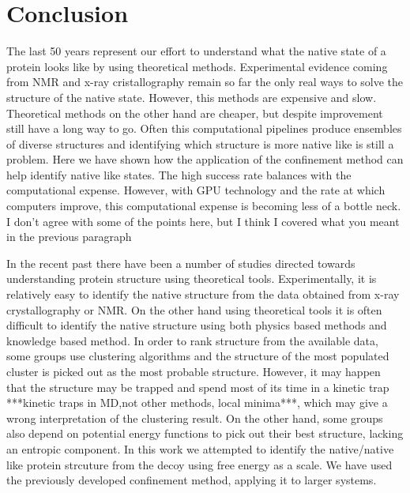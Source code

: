 \documentclass[12pt]{article}
\newcommand{\Alberto}[1]{\color{ForestGreen}#1\normalcolor }
\begin{document}
\section{Conclusion}


\Alberto{The last 50 years represent our effort to understand what the native state of a protein
    looks like by using theoretical methods. Experimental evidence coming from NMR and x-ray
    cristallography remain so far the only real ways to solve the structure of the native state.
    However, this methods are expensive and slow. Theoretical methods on the other hand are cheaper,
    but despite improvement still have a long way to go. Often this computational pipelines produce
    ensembles of diverse structures and identifying which structure is more native like is still a
    problem. Here we have shown how the application of the confinement method can help identify
    native like states. The high success rate balances with the computational expense. However, with
    GPU technology and the rate at which computers improve, this computational expense is becoming
less of a bottle neck.}
\Alberto{I don't agree with some of the points here, but I think I covered what you meant in the
previous paragraph}

In the recent past there have been a number of studies directed towards understanding protein
structure using theoretical tools. Experimentally, it is relatively easy to identify the native
structure from the data obtained from x-ray crystallography or NMR. On the other hand using
theoretical tools it is often difficult to identify the native structure using both physics based
methods and knowledge based method. In order to rank structure from the available data, some groups
use clustering algorithms and the structure of the most populated cluster is picked out as the most
probable structure. However, it may happen that the structure may be trapped and spend most of its
time in a kinetic trap ***kinetic traps in MD,not other methods, local minima***, which may give a
wrong interpretation of the clustering result. On the other hand, some groups also depend on
potential energy functions to pick out their best structure, lacking an entropic component. In this
work we attempted to identify the native/native like protein strcuture from the decoy using free
energy as a scale. We have used the previously developed confinement method, applying it to larger
systems.
\end{document}
